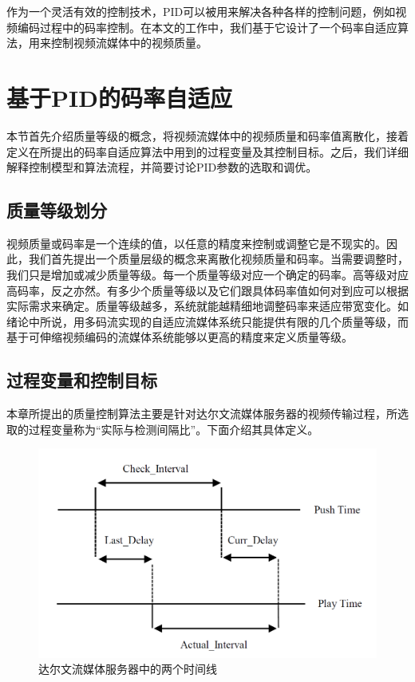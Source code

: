 作为一个灵活有效的控制技术，PID可以被用来解决各种各样的控制问题，例如视频编码过程中的码率控制\supercite{Li1999,Wong2004,Shen2009,Yang2010,Zhou2011}。在本文的工作中，我们基于它设计了一个码率自适应算法，用来控制视频流媒体中的视频质量。

\section{基于PID的码率自适应}

本节首先介绍质量等级的概念，将视频流媒体中的视频质量和码率值离散化，接着定义在所提出的码率自适应算法中用到的过程变量及其控制目标。之后，我们详细解释控制模型和算法流程，并简要讨论PID参数的选取和调优。

\subsection{质量等级划分}

视频质量或码率是一个连续的值，以任意的精度来控制或调整它是不现实的。因此，我们首先提出一个质量层级的概念来离散化视频质量和码率。当需要调整时，我们只是增加或减少质量等级。每一个质量等级对应一个确定的码率。高等级对应高码率，反之亦然。有多少个质量等级以及它们跟具体码率值如何对到应可以根据实际需求来确定。质量等级越多，系统就能越精细地调整码率来适应带宽变化。如绪论中所说，用多码流实现的自适应流媒体系统只能提供有限的几个质量等级，而基于可伸缩视频编码的流媒体系统能够以更高的精度来定义质量等级。

\subsection{过程变量和控制目标}

本章所提出的质量控制算法主要是针对达尔文流媒体服务器的视频传输过程，所选取的过程变量称为“实际与检测间隔比”。下面介绍其具体定义。

\begin{figure}[t]
	\vspace{10pt}
	\centering
	\includegraphics[width = 0.6\linewidth]{figures/intervals.png}
	\vspace{10pt}
	\caption{达尔文流媒体服务器中的两个时间线 \label{fig:intervals}}
\end{figure}

